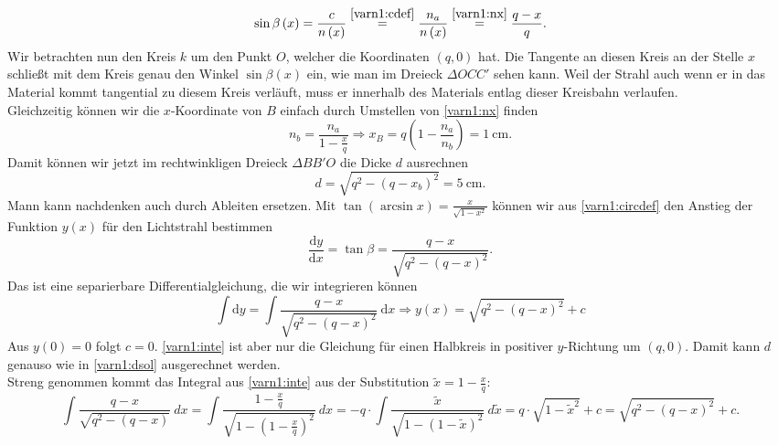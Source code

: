 \begin{Answer}[ref = varn1]
	\begin{equation}\label{varn1:circdef}
		\sin \beta\left(x\right) = \frac{c}{n\left(x\right)} \overset{\eqref{varn1:cdef}}{=} \frac{n_a}{n\left(x\right)} \overset{\eqref{varn1:nx}}{=} \frac{q-x}{q}.
	\end{equation}
	Wir betrachten nun den Kreis $k$ um den Punkt $O$, welcher die Koordinaten $\left(q,0\right)$ hat. Die Tangente an diesen Kreis an der Stelle $x$ schließt mit dem Kreis genau den Winkel $\sin \beta\left(x\right)$ ein, wie man im Dreieck $\Delta OCC'$ sehen kann. Weil der Strahl auch wenn er in das Material kommt tangential zu diesem Kreis verläuft, muss er innerhalb des Materials entlag dieser Kreisbahn verlaufen.\\
	Gleichzeitig können wir die $x$-Koordinate von $B$ einfach durch Umstellen von \eqref{varn1:nx} finden
	\begin{equation}\label{varn1:xb}
		n_b = \frac{n_a}{1-\frac{x}{q}}\Rightarrow x_B =q \left(1-\frac{n_a}{n_b}\right) = 1~\mathrm{cm}.
	\end{equation}
	Damit können wir jetzt im rechtwinkligen Dreieck $\Delta BB'O$ die Dicke $d$ ausrechnen
	\begin{equation}\label{varn1:dsol}
	\boxed{
		d = \sqrt{q^2-\left(q-x_b\right)^2} = 5~\mathrm{cm}.}
	\end{equation}
	Mann kann nachdenken auch durch Ableiten ersetzen. Mit $\tan\left(\arcsin x\right) = \frac{x}{\sqrt{1-x^2}}$ können wir aus \eqref{varn1:circdef} den Anstieg der Funktion $y\left(x\right)$ für den Lichtstrahl bestimmen
	\begin{equation*}
		\frac{\mathrm{d}y}{\mathrm{d}x} = \tan \beta = \frac{q-x}{\sqrt{q^2-\left(q-x\right)^2}}.
	\end{equation*}
	Das ist eine separierbare Differentialgleichung, die wir integrieren können
	\begin{equation}\label{varn1:inte}
		\int \mathrm{d}y = \int \frac{q-x}{\sqrt{q^2-\left(q-x\right)^2}}~\mathrm{d}x \Rightarrow y\left(x\right)= \sqrt{q^2-\left(q-x\right)^2}+c
	\end{equation}
	Aus $y\left(0\right)= 0$ folgt $c=0$. \eqref{varn1:inte} ist aber nur die Gleichung für einen Halbkreis in positiver $y$-Richtung um $\left(q,0\right)$. Damit kann $d$ genauso wie in \eqref{varn1:dsol} ausgerechnet werden.\\
	Streng genommen kommt das Integral aus \eqref{varn1:inte} aus der Substitution $\tilde{x} = 1-\frac{x}{q}$:
	\begin{equation*}
		\int \frac{q-x}{\sqrt{q^2-\left(q-x\right)}}~dx = \int \frac{1-\frac{x}{q}}{\sqrt{1-\left(1-\frac{x}{q}\right)^2}}~dx = -q \cdot  \int \frac{\tilde{x}}{\sqrt{1-\left(1-\tilde{x}\right)^2}}~d\tilde{x} = q \cdot  \sqrt{1-\tilde{x}^2} + c = \sqrt{q^2-\left(q-x\right)^2} + c.
	\end{equation*}
	
\end{Answer}